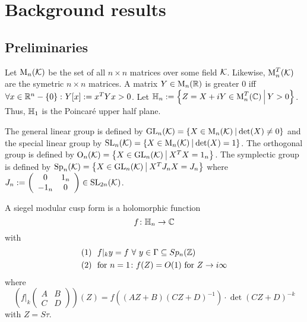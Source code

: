
\section{Background results}

\subsection{Preliminaries}

Let $\operatorname{M}_n(\mathcal{K})$ be the set of all $n \times n$ matrices over some field $\mathcal{K}$.
Likewise, $\operatorname{M}_n^T(\mathcal{K})$ are the symetric $n \times n$ matrices.
A matrix $Y \in \operatorname{M}_n(\mathbb{R})$ is greater $0$ iff $\forall x \in \R^n - \Set{0} \colon Y[x] := x^T Y x > 0$.
Let $\HalfPlane_n := \Set{Z = X + iY \in \M_n^T(\C)}{Y > 0}$.
Thus, $\mathbb{H}_1$ is the Poincaré upper half plane.

The general linear group is defined by $\GL_n(\K) = \Set{X \in \M_n(\K)}{\det(X) \neq 0}$
and the special linear group by $\SL_n(\K) = \Set{X \in \M_n(\K)}{\det(X) = 1}$.
The orthogonal group is defined by $\Orth_n(\K) = \Set{X \in \GL_n(\K)}{X^T X = 1_n}$.
The symplectic group is defined by $\Sp_n(\K) = \Set{X \in \GL_n(\K)}{X^T J_n X = J_n}$
where $J_n := \left( \begin{array}{cc} 0 & 1_n \\ -1_n & 0 \end{array} \right) \in \operatorname{SL}_{2n}(\mathcal{K})$.

A siegel modular cusp form is a holomorphic function
\[ f \colon \mathbb{H}_n \rightarrow \mathbb{C} \]
with
\begin{align*}
(1) \ \ & f |_k y = f \ \forall \ y \in \Gamma \subseteq Sp_n(\mathbb{Z}) \\
(2) \ \ & \text{for } n = 1 \colon f(Z) = O(1) \text{ for } Z \rightarrow i \infty
\end{align*}
where
\[ \left( f|_k \left( \begin{array}{ccc}
A & B \\
C & D \end{array} \right) \right) (Z) =
f((AZ + B)(CZ + D)^{-1}) \cdot \det(CZ + D)^{-k} \]
with $Z = S \tau$.



